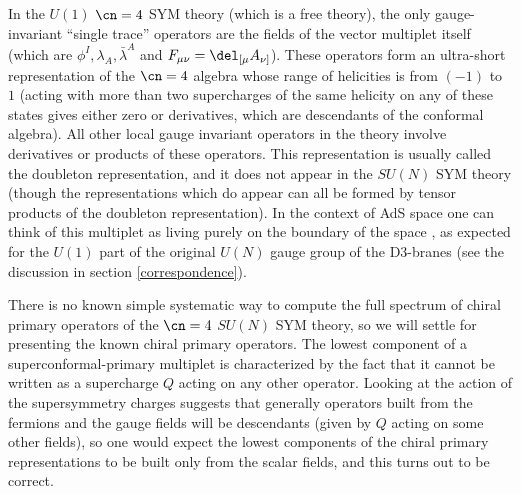 In the $U(1)$ $\cn=4$ SYM theory (which is a free theory), the only
gauge-invariant ``single trace'' operators are the fields of the
vector multiplet itself (which are $\phi^I,\lambda_A,
{\bar \lambda}^A$ and $F_{\mu \nu}
= \del_{[\mu} A_{\nu]}$). These operators form an ultra-short
representation of the $\cn=4$ algebra whose range of helicities is
from $(-1)$ to $1$ (acting with more than two supercharges of the same
helicity on any of these states gives either zero or derivatives,
which are descendants of the conformal algebra). All other local gauge
invariant operators in the theory involve derivatives or products of
these operators. This representation is usually called the doubleton
representation, and it does not appear in the $SU(N)$ SYM theory
(though the representations which do appear can all be formed by
tensor products of the doubleton representation). In the context of
AdS space one can think of this multiplet as living purely on the
boundary of the space \cite{Flato:1978qz,Fronsdal:1980aa,
Flato:1981we,Angelopoulos:1981wg,Nicolai:1984gb,Gunaydin:1985wc,
Gunaydin:1985vz,Flato:1986bf,Ferrara:1997dh,Ferrara:1998bv,Ferrara:1998jm}, as
expected for the $U(1)$ part of the original $U(N)$ gauge group of the
D3-branes (see the discussion in section \ref{correspondence}).

There is no known
simple systematic way to compute the full spectrum of
chiral primary operators of the $\cn=4$ $SU(N)$ SYM theory, so we will
settle for presenting the known chiral primary operators. The lowest
component of a superconformal-primary multiplet is characterized by
the fact that it cannot be written as a supercharge $Q$ acting on any
other operator. Looking at the action of the supersymmetry charges
 suggests that generally operators built from the
fermions and the gauge fields will be descendants (given by $Q$ acting
on some other fields), so one would expect the lowest components of
the chiral primary representations to be built only from the scalar
fields, and this turns out to be correct.

